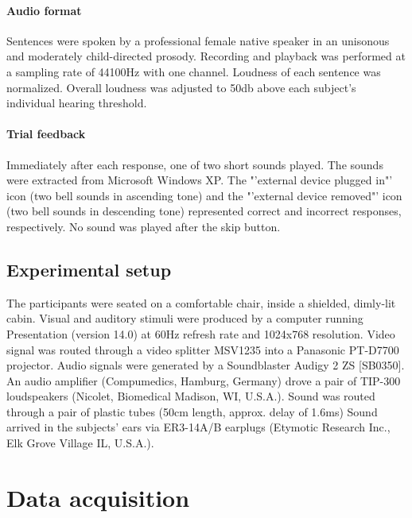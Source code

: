 \paragraph{Audio format}
Sentences were spoken by a professional female native speaker in an uni\-so\-nous and moderately child-directed prosody.
Recording and playback was performed at a sampling rate of 44100Hz with one channel.
Loudness of each sentence was normalized.
Overall loudness was adjusted to 50db above each subject's individual hearing threshold.

\paragraph{Trial feedback}
Immediately after each response, one of two short sounds played.
The sounds were extracted from Microsoft Windows XP.
The "'external device plugged in"' icon (two bell sounds in ascending tone) and the "'external device removed"' icon (two bell sounds in descending tone) represented correct and incorrect responses, respectively.
No sound was played after the skip button.

\subsection{Experimental setup}
The participants were seated on a comfortable chair, inside a shielded, dimly-lit cabin.
Visual and auditory stimuli were produced by a computer running Presentation (version 14.0) at 60Hz refresh rate and 1024x768 resolution.
Video signal was routed through a video splitter MSV1235 into a Panasonic PT-D7700 projector.
Audio signals were generated by a Soundblaster Audigy 2 ZS [SB0350].
An audio amplifier (Compumedics, Hamburg, Germany) drove a pair of TIP-300 loudspeakers (Nicolet, Biomedical Madison, WI, U.S.A.).
Sound was routed through a pair of plastic tubes (50cm length, approx. delay of 1.6ms)
Sound arrived in the subjects' ears via ER3-14A/B earplugs (Etymotic Research Inc., Elk Grove Village IL, U.S.A.).

\section{Data acquisition}

